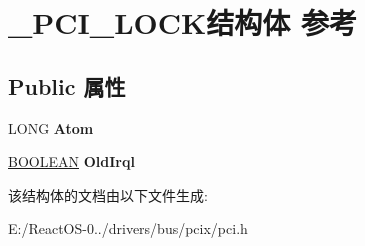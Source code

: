 \hypertarget{struct___p_c_i___l_o_c_k}{}\section{\+\_\+\+P\+C\+I\+\_\+\+L\+O\+C\+K结构体 参考}
\label{struct___p_c_i___l_o_c_k}
\subsection*{Public 属性}
\begin{DoxyCompactItemize}
\item 
\mbox{\label{struct___p_c_i___l_o_c_k_ae50da88ecdb3ac83b66c0f7d139d239b}} 
L\+O\+NG {\bfseries Atom}
\item 
\mbox{\label{struct___p_c_i___l_o_c_k_ae442ca2eab873509257e98b708bd2595}} 
\hyperlink{_processor_bind_8h_a112e3146cb38b6ee95e64d85842e380a}{B\+O\+O\+L\+E\+AN} {\bfseries Old\+Irql}
\end{DoxyCompactItemize}


该结构体的文档由以下文件生成\+:\begin{DoxyCompactItemize}
\item 
E\+:/\+React\+O\+S-\/0../drivers/bus/pcix/pci.\+h\end{DoxyCompactItemize}
